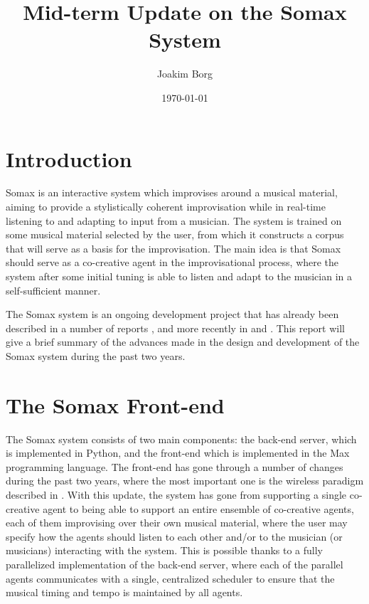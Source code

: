 \documentclass[10pt]{article}        %
\title{Mid-term Update on the Somax System}
\author{Joakim Borg}
\date{\today}
\begin{document}
\maketitle

\section{Introduction}
\noindent Somax is an interactive system which improvises around a musical material, aiming to provide a stylistically coherent improvisation while in real-time listening to and adapting to input from a musician. The system is trained on some musical material selected by the user, from which it constructs a corpus that will serve as a basis for the improvisation. The main idea is that Somax should serve as a co-creative agent in the improvisational process, where the system after some initial tuning is able to listen and adapt to the musician in a self-sufficient manner. 

The Somax system is an ongoing development project that has already been described in a number of reports \cite{bonnasse-gahot_update_2014}, \cite{borg_2019} and more recently in \cite{somaxsoftware2021} and \cite{somaxtheory2021}. This report will give a brief summary of the advances made in the design and development of the Somax system during the past two years.

\section{The Somax Front-end}
The Somax system consists of two main components: the back-end server, which is implemented in Python, and the front-end which is implemented in the Max programming language\cite{maxmsp2020}. The front-end has gone through a number of changes during the past two years, where the most important one is the wireless paradigm described in \cite{somaxsoftware2021}. With this update, the system has gone from supporting a single co-creative agent to being able to support an entire ensemble of co-creative agents, each of them improvising over their own musical material, where the user may specify how the agents should listen to each other and/or to the musician (or musicians) interacting with the system. This is possible thanks to a fully parallelized implementation of the back-end server, where each of the parallel agents communicates with a single, centralized scheduler to ensure that the musical timing and tempo is maintained by all agents.
\end{document}
